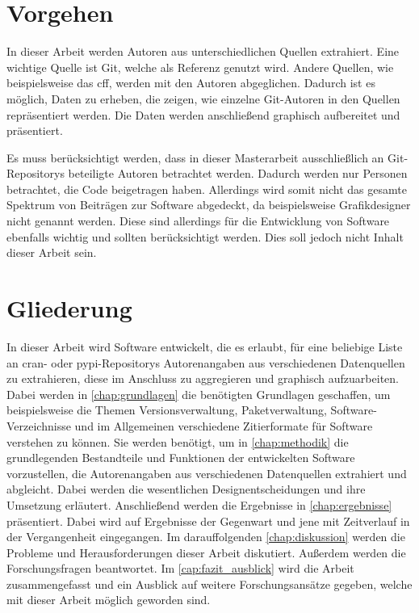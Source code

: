 \section{Vorgehen}
\label{sec:vorgehen}
In dieser Arbeit werden Autoren aus unterschiedlichen Quellen extrahiert.
Eine wichtige Quelle ist Git, welche als Referenz genutzt wird.
Andere Quellen, wie beispielsweise das \gls{cff}, werden mit den Autoren abgeglichen.
Dadurch ist es möglich, Daten zu erheben, die zeigen, wie einzelne Git-Autoren in den Quellen repräsentiert werden.
Die Daten werden anschließend graphisch aufbereitet und präsentiert.

Es muss berücksichtigt werden, dass in dieser Masterarbeit ausschließlich an Git-Repositorys beteiligte Autoren betrachtet werden.
Dadurch werden nur Personen betrachtet, die Code beigetragen haben.
Allerdings wird somit nicht das gesamte Spektrum von Beiträgen zur Software abgedeckt, da beispielsweise Grafikdesigner nicht genannt werden.
Diese sind allerdings für die Entwicklung von Software ebenfalls wichtig und sollten berücksichtigt werden.
Dies soll jedoch nicht Inhalt dieser Arbeit sein.

\section{Gliederung}
\label{sec:gliederung}
In dieser Arbeit wird Software entwickelt, die es erlaubt, für eine beliebige Liste an \gls{cran}- oder \gls{pypi}-Repositorys Autorenangaben aus verschiedenen Datenquellen zu extrahieren, diese im Anschluss zu aggregieren und graphisch aufzuarbeiten.
Dabei werden in \autoref{chap:grundlagen} die benötigten Grundlagen geschaffen, um beispielsweise die Themen Versionsverwaltung, Paketverwaltung, Software-Verzeichnisse und im Allgemeinen verschiedene Zitierformate für Software verstehen zu können.
Sie werden benötigt, um in \autoref{chap:methodik} die grundlegenden Bestandteile und Funktionen der entwickelten Software vorzustellen, die Autorenangaben aus verschiedenen Datenquellen extrahiert und abgleicht.
Dabei werden die wesentlichen Designentscheidungen und ihre Umsetzung erläutert.
Anschließend werden die Ergebnisse in \autoref{chap:ergebnisse} präsentiert.
Dabei wird auf Ergebnisse der Gegenwart und jene mit Zeitverlauf in der Vergangenheit eingegangen.
Im darauffolgenden \autoref{chap:diskussion} werden die Probleme und Herausforderungen dieser Arbeit diskutiert.
Außerdem werden die Forschungsfragen beantwortet.
Im \autoref{cap:fazit_ausblick} wird die Arbeit zusammengefasst und ein Ausblick auf weitere Forschungsansätze gegeben, welche mit dieser Arbeit möglich geworden sind.
